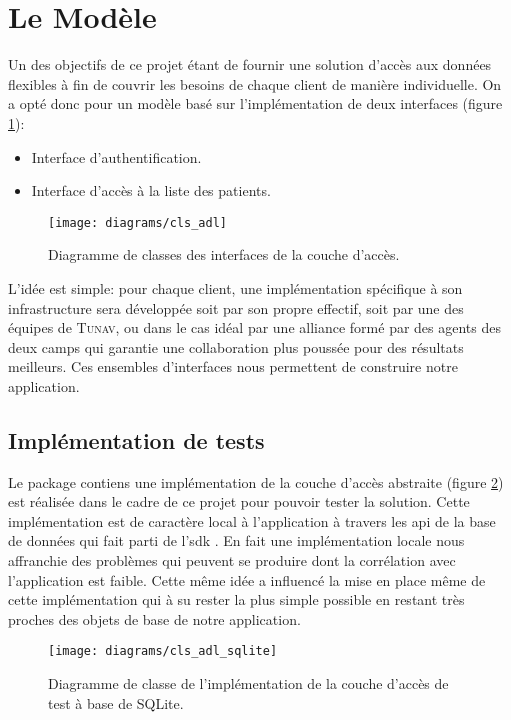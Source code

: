 \section{Le Modèle} 

Un des objectifs de ce projet étant de fournir une solution d’accès aux
données flexibles à fin de couvrir les besoins de chaque client de
manière individuelle. On a opté donc pour un modèle basé sur
l’implémentation de deux interfaces (figure \ref{fig:adl}):

\begin{itemize}
\item Interface d'authentification.
\item Interface d’accès à la liste des patients.
\end{itemize}

\begin{figure}
\center
\texttt{[image: diagrams/cls\_adl]}
\caption{Diagramme de classes des interfaces de la couche d’accès.}
\label{fig:adl}
\end{figure}

L'idée est simple: pour chaque client, une implémentation spécifique à son infrastructure sera développée soit par son propre effectif, soit par une des équipes de \textsc{Tunav}, ou dans le cas idéal par une alliance formé par des agents des deux camps qui garantie une collaboration plus poussée pour des résultats meilleurs.
Ces ensembles d'interfaces nous permettent de construire notre application.

\subsection{Implémentation de tests} 

Le package  contiens une
implémentation de la couche d’accès abstraite (figure
\ref{fig:adl_sqlite}) est réalisée dans le cadre de ce projet pour
pouvoir tester la solution. Cette implémentation est de caractère local
à l'application à travers les \gls{api} de la base de données
 qui fait parti de l'\gls{sdk} \android{}. En fait une
implémentation locale nous affranchie des problèmes qui peuvent se
produire dont la corrélation avec l'application est faible. Cette même
idée a influencé la mise en place même de cette implémentation qui à su
rester la plus simple possible en restant très proches des objets de
base de notre application.

\begin{figure}
\center
\texttt{[image: diagrams/cls\_adl\_sqlite]}
\caption{Diagramme de classe de l'implémentation de la couche d'accès de test à base de SQLite.}
\label{fig:adl_sqlite}
\end{figure}

